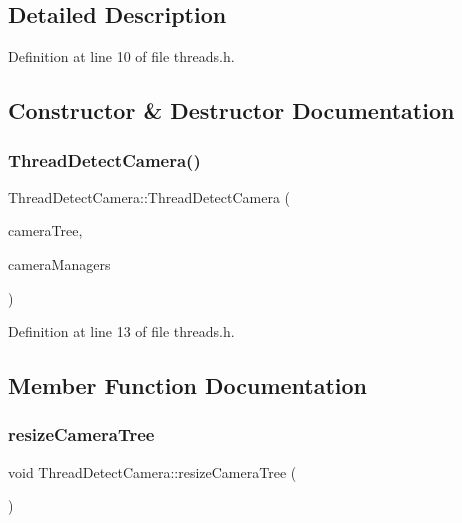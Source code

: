 \subsection{Detailed Description}


Definition at line 10 of file threads.\+h.



\subsection{Constructor \& Destructor Documentation}
\mbox{\label{class_thread_detect_camera_a1c6b8e5f0c0616b09b1e3a8129073d01}} 
\subsubsection{\texorpdfstring{ThreadDetectCamera()}{ThreadDetectCamera()}}
{\footnotesize\ttfamily Thread\+Detect\+Camera\+::\+Thread\+Detect\+Camera (\begin{DoxyParamCaption}\item[{Q\+Tree\+View $\ast$}]{camera\+Tree,  }\item[{std\+::vector$<$ \mbox{\hyperlink{class_abstract_camera_manager}{Abstract\+Camera\+Manager}} $\ast$ $>$ $\ast$}]{camera\+Managers }\end{DoxyParamCaption})\hspace{0.3cm}{\ttfamily [inline]}}



Definition at line 13 of file threads.\+h.



\subsection{Member Function Documentation}
\mbox{\label{class_thread_detect_camera_a494364e22e852d705ee2ddfd81d279c9}} 
\subsubsection{\texorpdfstring{resizeCameraTree}{resizeCameraTree}}
{\footnotesize\ttfamily void Thread\+Detect\+Camera\+::resize\+Camera\+Tree (\begin{DoxyParamCaption}{ }\end{DoxyParamCaption})\hspace{0.3cm}{\ttfamily [signal]}}

